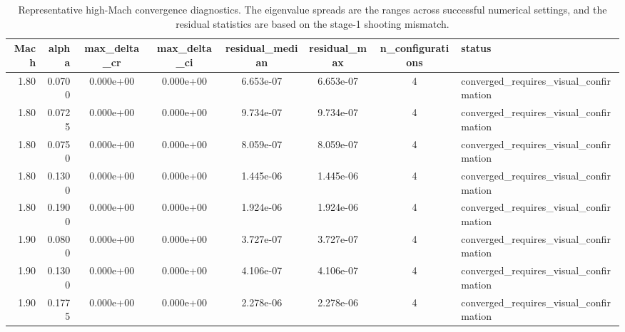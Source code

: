 \begin{table}
\caption{Representative high-Mach convergence diagnostics. The eigenvalue spreads are the ranges across successful numerical settings, and the residual statistics are based on the stage-1 shooting mismatch.}
\label{tab:supersonic_convergence_robustness_summary}
\begin{tabular}{rrcccccl}
\toprule
Mach & alpha & max\_delta\_cr & max\_delta\_ci & residual\_median & residual\_max & n\_configurations & status \\
\midrule
1.80 & 0.0700 & 0.000e+00 & 0.000e+00 & 6.653e-07 & 6.653e-07 & 4 & converged\_requires\_visual\_confirmation \\
1.80 & 0.0725 & 0.000e+00 & 0.000e+00 & 9.734e-07 & 9.734e-07 & 4 & converged\_requires\_visual\_confirmation \\
1.80 & 0.0750 & 0.000e+00 & 0.000e+00 & 8.059e-07 & 8.059e-07 & 4 & converged\_requires\_visual\_confirmation \\
1.80 & 0.1300 & 0.000e+00 & 0.000e+00 & 1.445e-06 & 1.445e-06 & 4 & converged\_requires\_visual\_confirmation \\
1.80 & 0.1900 & 0.000e+00 & 0.000e+00 & 1.924e-06 & 1.924e-06 & 4 & converged\_requires\_visual\_confirmation \\
1.90 & 0.0800 & 0.000e+00 & 0.000e+00 & 3.727e-07 & 3.727e-07 & 4 & converged\_requires\_visual\_confirmation \\
1.90 & 0.1300 & 0.000e+00 & 0.000e+00 & 4.106e-07 & 4.106e-07 & 4 & converged\_requires\_visual\_confirmation \\
1.90 & 0.1775 & 0.000e+00 & 0.000e+00 & 2.278e-06 & 2.278e-06 & 4 & converged\_requires\_visual\_confirmation \\
\bottomrule
\end{tabular}
\end{table}
